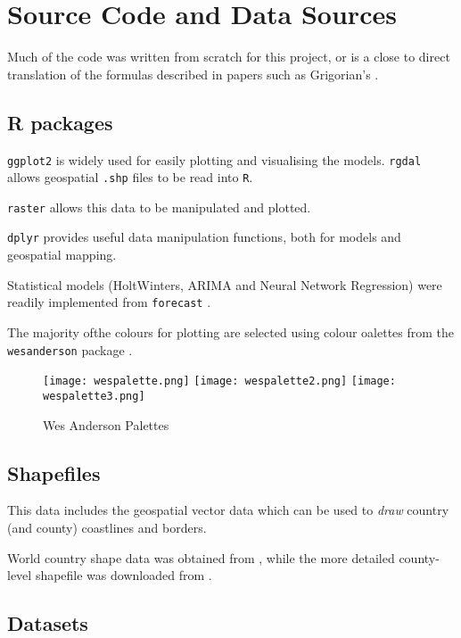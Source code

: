 \section{Source Code and Data Sources}
\label{ch:codesource}

Much of the code was written from scratch for this project, or is a close to direct translation of the formulas described in papers such as Grigorian's \cite{grigor20}.

\subsection{R packages}

\verb|ggplot2|  \cite{ggplot2} is widely used for easily plotting and visualising the models. \verb|rgdal| \cite{rgdal} allows geospatial \verb|.shp| files to be read into \verb|R|. 

\verb|raster| \cite{raster} allows this data to be manipulated and plotted. 

\verb|dplyr| \cite{dplyr}  provides useful data manipulation functions, both for models and geospatial mapping. 

Statistical models (HoltWinters, ARIMA and Neural Network Regression) were readily implemented from \verb|forecast| \cite{forecast}.

The majority ofthe colours for plotting are selected using colour oalettes from the \verb|wesanderson| package \cite{wesanderson20}.

\begin{figure}[!htb]
  \texttt{[image: wespalette.png]} \label{fig:wespalette}
  \texttt{[image: wespalette2.png]} \label{fig:wespalette2}
  \texttt{[image: wespalette3.png]} \label{fig:wespalette3}
\endminipage
\caption{Wes Anderson Palettes}
\end{figure}


\subsection{Shapefiles}

This data includes the geospatial vector data which can be used to \textit{draw} country (and county) coastlines and borders. 

World country shape data was obtained from \cite{countryshape}, while the more detailed county-level shapefile was downloaded from \cite{countyshape}.

\subsection{Datasets}

